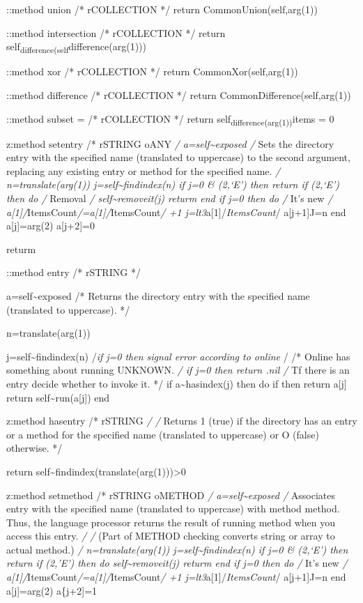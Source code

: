 ::method union /* rCOLLECTION */ return CommonUnion(self,arg(1))

::method intersection /* rCOLLECTION */ return
self\textsubscript{difference(self}difference(arg(1)))

::method xor /* rCOLLECTION */ return CommonXor(self,arg(1))

::method difference /* rCOLLECTION */ return
CommonDifference(self,arg(1))

::method subset = /* rCOLLECTION */ return
self\textsubscript{difference(arg(1))}items = 0

z:method setentry /* rSTRING oANY \emph{/ a=self\textasciitilde exposed
/} Sets the directory entry with the specified name (translated to
uppercase) to the second argument, replacing any existing entry or
method for the specified name. \emph{/ n=translate(arg(1))
j=self\textasciitilde findindex(n) if j=0 \& \arg(2,`E') then return if
\arg(2,`E') then do /} Removal \emph{/ self\textasciitilde removeit(j)
returm end if j=0 then do /} It's new \emph{/
a{[}1{]}/}ItemsCount\emph{/=a{[}1{]}/}ItemsCount\emph{/ +1
j=lt3}a{[}1{]}/\emph{ItemsCount}/ a{[}j+1{]}J=n end a{[}j{]}=arg(2)
a{[}j+2{]}=0

returm

::method entry /* rSTRING */

a=self\textasciitilde exposed /* Returns the directory entry with the
specified name (translated to uppercase). */

n=translate(arg(1))

j=self\textasciitilde findindex(n) /\emph{if j=0 then signal error
according to online }/ /* Online has something about running UNKNOWN.
\emph{/ if j=0 then return .nil /} Tf there is an entry decide whether
to invoke it. */ if a\textasciitilde hasindex(j) then do if \a[j+2] then
return a{[}j{]} return self\textasciitilde run(a{[}j{]}) end

z:method hasentry /* rSTRING \emph{/ /} Returns 1\textbar{} (true) if
the directory has an entry or a method for the specified name
(translated to uppercase) or O (false) otherwise. */

return self\textasciitilde findindex(translate(arg(1)))\textgreater0

z:method setmethod /* rSTRING oMETHOD \emph{/
a=self\textasciitilde exposed /} Associates entry with the specified
name (translated to uppercase) with method method. Thus, the language
processor returns the result of running method when you access this
entry. \emph{/ /} (Part of METHOD checking converts string or array to
actual method.) \emph{/ n=translate(arg(1))
j=self\textasciitilde findindex(n) if j=0 \& \arg(2,`E') then return if
\arg(2,'E') then do self\textasciitilde removeit(j) returm end if j=0
then do /} It's new \emph{/
a{[}1{]}/}ItemsCount\emph{/=a{[}1{]}/}ItemsCount\emph{/ +1
j=lt3}a{[}1{]}/\emph{ItemsCount}/ a{[}j+1{]}J=n end a{[}j{]}=arg(2)
a\{j+2{]}=1

